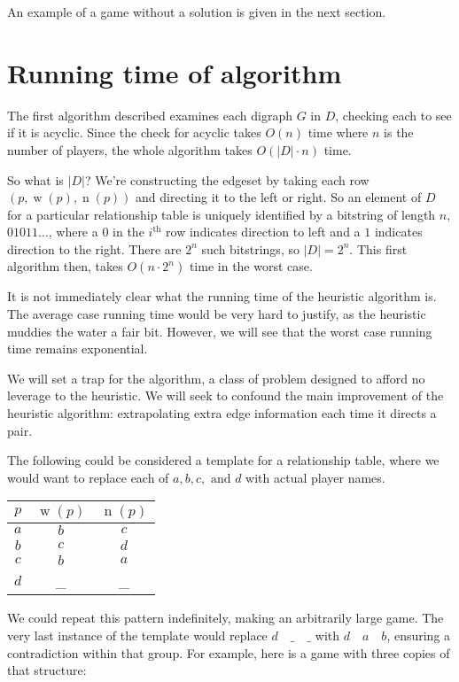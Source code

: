 \documentclass[12pt]{article}
\DeclareMathOperator{\w}{w}
\DeclareMathOperator{\n}{n}
\begin{document}
    An example of a game without a solution is given in the next section.

\section{Running time of algorithm}
    The first algorithm described examines each digraph $G$ in $D$, checking each to see if it is acyclic. Since the check for acyclic takes $O(n)$ time where $n$ is the number of players, the whole algorithm takes $O(\lvert D \rvert \cdot n)$ time. 

    So what is $\lvert D \rvert$? We're constructing the edgeset by taking each row $(p, \w(p), \n(p))$ and directing it to the left or right. So an element of $D$ for a particular relationship table is uniquely identified by a bitstring of length $n$, $01011\ldots$, where a $0$ in the $i^{\text{th}}$ row indicates direction to left and a $1$ indicates direction to the right. There are $2^n$ such bitstrings, so $\lvert D \rvert = 2^n$. This first algorithm then, takes $O(n \cdot 2^n)$ time in the worst case. 

    It is not immediately clear what the running time of the heuristic algorithm is. The average case running time would be very hard to justify, as the heuristic muddies the water a fair bit. However, we will see that the worst case running time remains exponential.

    We will set a trap for the algorithm, a class of problem designed to afford no leverage to the heuristic. We will seek to confound the main improvement of the heuristic algorithm: extrapolating extra edge information each time it directs a pair. 

    The following could be considered a template for a relationship table, where we would want to replace each of $a, b, c, \text{ and }d$ with actual player names.

    \begin{center}
        \begin{tabular}{c | c | c}
            $p$ & $\w(p)$ & $\n(p)$\\
            \hline
            $a$ & $b$ & $c$\\
            $b$ & $c$ & $d$\\
            $c$ & $b$ & $a$\\
            $d$ & \_ & \_
        \end{tabular}
    \end{center}

    We could repeat this pattern indefinitely, making an arbitrarily large game. The very last instance of the template would replace $d \quad \_ \quad \_$ with $d \quad a \quad b$, ensuring a contradiction within that group. For example, here is a game with three copies of that structure:
\end{document}
